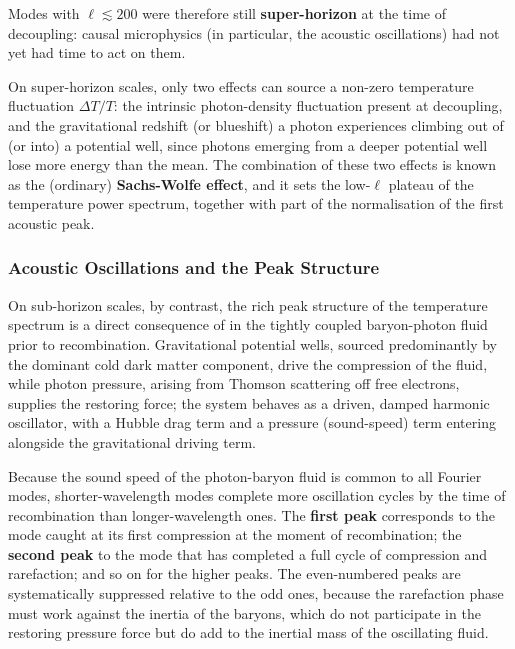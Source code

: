 \medskip

Modes with $\ell \lesssim 200$ were therefore still \textbf{super-horizon} at the time of decoupling: causal microphysics (in particular, the acoustic oscillations) had not yet had time to act on them.

On super-horizon scales, only two effects can source a non-zero temperature fluctuation $\Delta T/T$: the intrinsic photon-density fluctuation present at decoupling, and the gravitational redshift (or blueshift) a photon experiences climbing out of (or into) a potential well, since photons emerging from a deeper potential well lose more energy than the mean. The combination of these two effects is known as the (ordinary) \textbf{Sachs-Wolfe effect}, and it sets the low-$\ell$ plateau of the temperature power spectrum, together with part of the normalisation of the first acoustic peak.

\vspace{-0.5em}

\subsubsection{Acoustic Oscillations and the Peak Structure} \label{subsec:acoustic_peaks_detail}

On sub-horizon scales, by contrast, the rich peak structure of the temperature spectrum is a direct consequence of  in the tightly coupled baryon-photon fluid prior to recombination. Gravitational potential wells, sourced predominantly by the dominant cold dark matter component, drive the compression of the fluid, while photon pressure, arising from Thomson scattering off free electrons, supplies the restoring force; the system behaves as a driven, damped harmonic oscillator, with a Hubble drag term and a pressure (sound-speed) term entering alongside the gravitational driving term.

\smallskip

Because the sound speed of the photon-baryon fluid is common to all Fourier modes, shorter-wavelength modes complete more oscillation cycles by the time of recombination than longer-wavelength ones. The \textbf{first peak} corresponds to the mode caught at its first compression at the moment of recombination; the \textbf{second peak} to the mode that has completed a full cycle of compression and rarefaction; and so on for the higher peaks. The even-numbered peaks are systematically suppressed relative to the odd ones, because the rarefaction phase must work against the inertia of the baryons, which do not participate in the restoring pressure force but do add to the inertial mass of the oscillating fluid.

